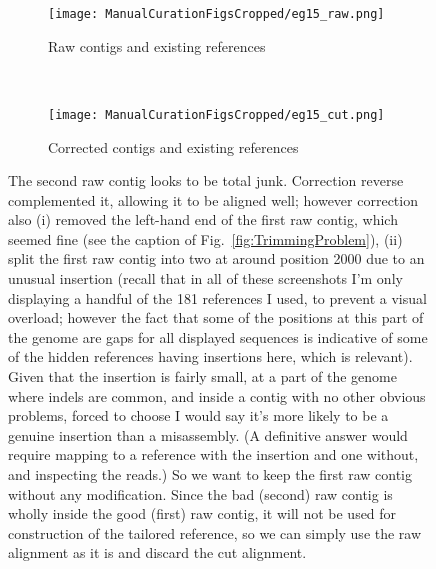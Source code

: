 \documentclass{article}
\begin{document}
\begin{landscape}
\begin{figure}[!h]
\centering
\begin{subfigure}{1.3\textwidth}
\texttt{[image: ManualCurationFigsCropped/eg15\_raw.png]}
\caption{Raw contigs and existing references}
\end{subfigure}
\vspace*{1cm} \\
\begin{subfigure}{1.3\textwidth}
\texttt{[image: ManualCurationFigsCropped/eg15\_cut.png]}
\caption{Corrected contigs and existing references}
\end{subfigure}
\caption{The second raw contig looks to be total junk.
Correction reverse complemented it, allowing it to be aligned well; however correction also (i) removed the left-hand end of the first raw contig, which seemed fine (see the caption of Fig.~\ref{fig:TrimmingProblem}), (ii) split the first raw contig into two at around position 2000 due to an unusual insertion (recall that in all of these screenshots I'm only displaying a handful of the 181 references I used, to prevent a visual overload; however the fact that some of the positions at this part of the genome are gaps for all displayed sequences is indicative of some of the hidden references having insertions here, which is relevant).
Given that the insertion is fairly small, at a part of the genome where indels are common, and inside a contig with no other obvious problems, forced to choose I would say it's more likely to be a genuine insertion than a misassembly.
(A definitive answer would require mapping to a reference with the insertion and one without, and inspecting the reads.)
So we want to keep the first raw contig without any modification.
Since the bad (second) raw contig is wholly inside the good (first) raw contig, it will not be used for construction of the tailored reference, so we can simply use the raw alignment as it is and discard the cut alignment.}
\end{figure}


\end{landscape}
\end{document}
